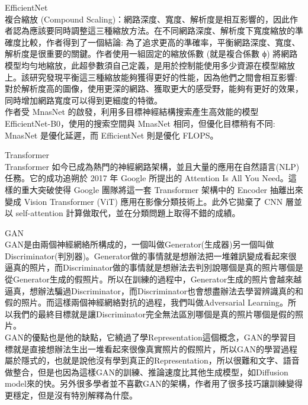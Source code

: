 \begin{flushleft}
  EfficientNet \cite{EfficientNet}
  \\\hspace{2em}
  複合縮放 (Compound Scaling)：網路深度、寬度、解析度是相互影響的，因此作者認為應該要同時調整這三種縮放方法。在不同網路深度、解析度下寬度縮放的準確度比較，作者得到了一個結論: 為了追求更高的準確率，平衡網路深度、寬度、解析度是很重要的關鍵。作者使用一組固定的縮放係數 (就是複合係數 ϕ) 將網路模型均勻地縮放，此超參數須自己定義，是用於控制能使用多少資源在模型縮放上。該研究發現平衡這三種縮放能夠獲得更好的性能，因為他們之間會相互影響: 對於解析度高的圖像，使用更深的網路、獲取更大的感受野，能夠有更好的效果，同時增加網路寬度可以得到更細度的特徵。
  \\\hspace{2em}作者受 MnasNet 的啟發，利用多目標神經結構搜索產生高效能的模型 EfficientNet-B0，使用的搜索空間與 MnasNet 相同，但優化目標稍有不同: MnasNet 是優化延遲，而 EfficientNet 則是優化 FLOPS。

  Transformer \cite{Transformer}
  \\\hspace{2em}Transformer 如今已成為熱門的神經網路架構，並且大量的應用在自然語言(NLP)任務。它的成功追朔於 2017 年 Google 所提出的 Attention Is All You Need。這樣的重大突破使得 Google 團隊將這一套 Transformer 架構中的 Encoder 抽離出來變成 Vision Transformer (ViT) 應用在影像分類技術上。此外它拋棄了 CNN 層並以 self-attention 計算做取代，並在分類問題上取得不錯的成績。

  GAN \cite{gan}
  \\\hspace{2em}GAN是由兩個神經網絡所構成的，一個叫做Generator(生成器)另一個叫做Discriminator(判別器)。Generator做的事情就是想辦法把一堆雜訊變成看起來很逼真的照片，而Discriminator做的事情就是想辦法去判別說哪個是真的照片哪個是從Generator生成的假照片。所以在訓練的過程中，Generator生成的照片會越來越逼真，想辦法騙過Discriminator，而Discriminator也會想盡辦法去學習辨識真的和假的照片。而這樣兩個神經網絡對抗的過程，我們叫做Adversarial Learning。所以我們的最終目標就是讓Discriminator完全無法區別哪個是真的照片哪個是假的照片。
  \\\hspace{2em}GAN的優點也是他的缺點，它繞過了學Representation這個概念，GAN的學習目標就是直接想辦法生出一堆看起來很像真實照片的假照片，所以GAN的學習過程屬於隱式的，也就是說他沒有學到真正的Representation，所以很難和文字、語音做整合，但是也因為這樣GAN的訓練、推論速度比其他生成模型，如Diffusion model來的快。另外很多學者並不喜歡GAN的架構，作者用了很多技巧讓訓練變得更穩定，但是沒有特別解釋為什麼。

  \end{flushleft}